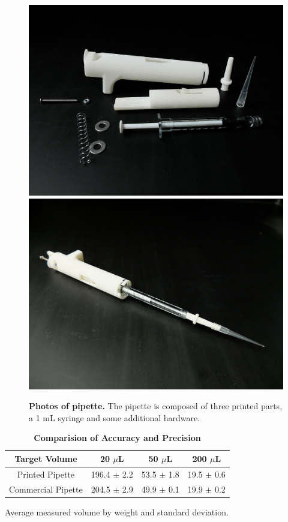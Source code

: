 \documentclass[]{article}
\begin{document}
\begin{figure}
\includegraphics[scale=0.04]{pipette-disassembled.JPG} %
\includegraphics[scale=0.04]{pipette-assembled.JPG} %
\caption{
{\bf Photos of pipette.}  The pipette is composed of three printed parts, a 1 mL syringe and some additional hardware.  
}
\label{photo-parts-figure}
\end{figure}

\begin{table}[!ht]
\caption{
\bf{Comparision of Accuracy and Precision}}
\begin{tabular}{|c|c|c|c|}
\hline
    Target Volume & 20 $\mu$L & 50 $\mu$L & 200 $\mu$L  \\
    \hline
    Printed Pipette & 196.4 $\pm$ 2.2 & 53.5 $\pm$ 1.8 & 19.5 $\pm$ 0.6 \\
    Commercial Pipette & 204.5 $\pm$ 2.9 & 49.9 $\pm$ 0.1 & 19.9 $\pm$ 0.2 \\
    \hline
\end{tabular}
\begin{flushleft} Average measured volume by weight and standard deviation.
\end{flushleft}
\label{tab:comp}
 \end{table}
\end{document}
